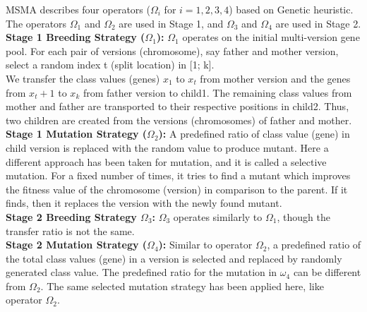 \documentclass[fleqn,usenatbib]{mnras}
\begin{document}
MSMA describes four operators ($\Omega_i$ for $i = {1, 2, 3, 4}$) based on Genetic heuristic. %
 The operators $\Omega_1$ and $\Omega_2$
are used in Stage 1, and $\Omega_3$ and $\Omega_4$ are used in Stage 2. \\
\noindent \textbf{Stage 1 Breeding Strategy ($\Omega_1$):}
\(\Omega_1\) operates on the initial multi-version gene pool. For each pair of versions (chromosome), say father and mother version, select a random index t (split location) in [1; k].\\
We transfer the class values (genes) $x_1$ to $x_t$ from mother version and the genes from $x_t+1$ to $x_k$ from father version to child1. The remaining class values from mother and father are transported to their respective positions in child2. Thus, two children are created from the versions (chromosomes) of father and mother. \\
\noindent \textbf{Stage 1 Mutation Strategy ($\Omega_2$):} A predefined ratio of class value (gene) in child version is replaced with the random value to produce mutant. Here a different approach has been taken for mutation, and it is called a selective mutation. For a fixed number of times, it tries to find a mutant which improves the fitness value of the chromosome (version) in comparison to the parent. If it finds, then it replaces the version with the newly found mutant.\\
\noindent \textbf{Stage 2 Breeding Strategy $\Omega_3$:}
$\Omega_3$ operates similarly to $\Omega_1$, though the transfer ratio is not the same.\\
\noindent \textbf{Stage 2 Mutation Strategy ($\Omega_4$):} Similar to operator $\Omega_2$, a predefined ratio of the total class values (gene) in a version is selected and replaced by randomly generated class value. 
The predefined ratio for the mutation in $\omega_4$ can be different from $\Omega_2$. The same selected mutation strategy has been applied here, like operator $\Omega_2$.
\end{document}
